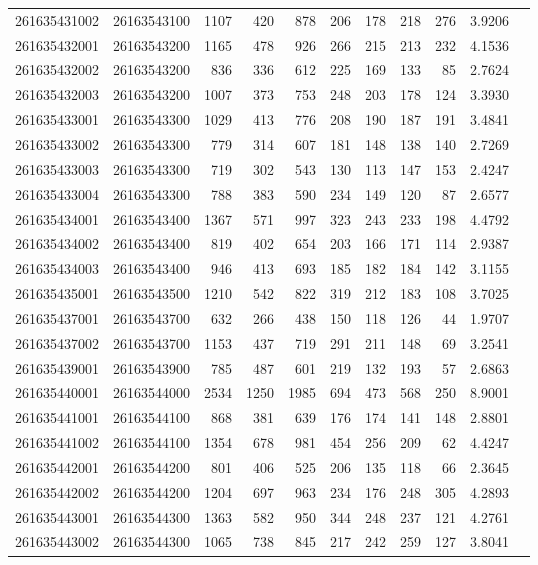 \documentclass[11pt,landscape]{article}
\begin{document}
{\begin{longtable}[]{@{}lrrrrrrrrrr@{}}
261635431002 & 26163543100 & 1107 & 420 & 878 & 206 & 178 & 218 & 276 & 3.9206 \\
261635432001 & 26163543200 & 1165 & 478 & 926 & 266 & 215 & 213 & 232 & 4.1536 \\
261635432002 & 26163543200 & 836 & 336 & 612 & 225 & 169 & 133 & 85 & 2.7624 \\
261635432003 & 26163543200 & 1007 & 373 & 753 & 248 & 203 & 178 & 124 & 3.3930 \\
261635433001 & 26163543300 & 1029 & 413 & 776 & 208 & 190 & 187 & 191 & 3.4841 \\
261635433002 & 26163543300 & 779 & 314 & 607 & 181 & 148 & 138 & 140 & 2.7269 \\
261635433003 & 26163543300 & 719 & 302 & 543 & 130 & 113 & 147 & 153 & 2.4247 \\
261635433004 & 26163543300 & 788 & 383 & 590 & 234 & 149 & 120 & 87 & 2.6577 \\
261635434001 & 26163543400 & 1367 & 571 & 997 & 323 & 243 & 233 & 198 & 4.4792 \\
261635434002 & 26163543400 & 819 & 402 & 654 & 203 & 166 & 171 & 114 & 2.9387 \\
261635434003 & 26163543400 & 946 & 413 & 693 & 185 & 182 & 184 & 142 & 3.1155 \\
261635435001 & 26163543500 & 1210 & 542 & 822 & 319 & 212 & 183 & 108 & 3.7025 \\
261635437001 & 26163543700 & 632 & 266 & 438 & 150 & 118 & 126 & 44 & 1.9707 \\
261635437002 & 26163543700 & 1153 & 437 & 719 & 291 & 211 & 148 & 69 & 3.2541 \\
261635439001 & 26163543900 & 785 & 487 & 601 & 219 & 132 & 193 & 57 & 2.6863 \\
261635440001 & 26163544000 & 2534 & 1250 & 1985 & 694 & 473 & 568 & 250 & 8.9001 \\
261635441001 & 26163544100 & 868 & 381 & 639 & 176 & 174 & 141 & 148 & 2.8801 \\
261635441002 & 26163544100 & 1354 & 678 & 981 & 454 & 256 & 209 & 62 & 4.4247 \\
261635442001 & 26163544200 & 801 & 406 & 525 & 206 & 135 & 118 & 66 & 2.3645 \\
261635442002 & 26163544200 & 1204 & 697 & 963 & 234 & 176 & 248 & 305 & 4.2893 \\
261635443001 & 26163544300 & 1363 & 582 & 950 & 344 & 248 & 237 & 121 & 4.2761 \\
261635443002 & 26163544300 & 1065 & 738 & 845 & 217 & 242 & 259 & 127 & 3.8041 \\

\end{longtable}}
\end{document}
